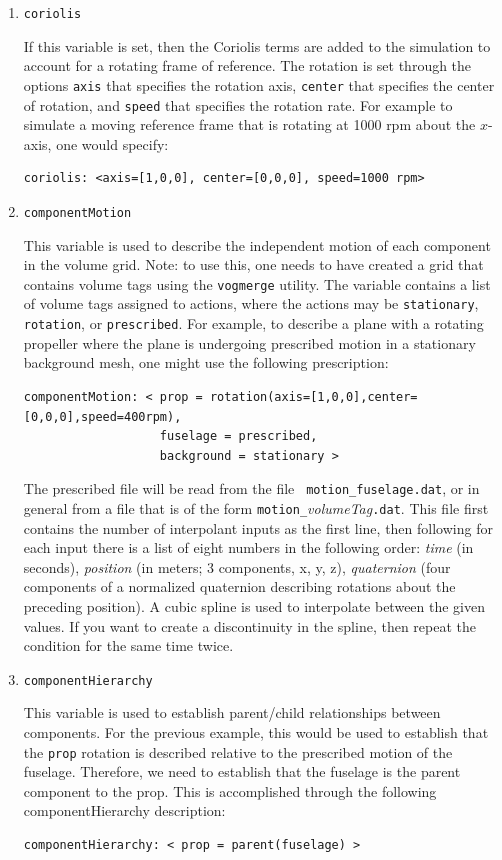 \documentclass{article}
\begin{document}
\begin{enumerate}
\item {\tt coriolis }

  If this variable is set, then the Coriolis terms are added to the
  simulation to account for a rotating frame of reference.  The
  rotation is set through the options {\tt axis} that specifies the
  rotation axis, {\tt center} that specifies the center of rotation,
  and {\tt speed} that specifies the rotation rate.  For example
  to simulate a moving reference frame that is rotating at 1000 rpm
  about the $x$-axis, one would specify:
\begin{verbatim}
coriolis: <axis=[1,0,0], center=[0,0,0], speed=1000 rpm>
\end{verbatim}
\item {\tt componentMotion }

This variable is used to describe the independent motion of each
component in the volume grid.  Note: to use this, one needs to have
created a grid that contains volume tags using the {\tt vogmerge}
utility.  The variable contains a list of volume tags assigned to
actions, where the actions may be {\tt stationary}, {\tt rotation}, or
{\tt prescribed}.  For example, to describe a plane with a rotating
propeller where the plane is undergoing prescribed motion in a
stationary background mesh, one might use the following prescription:
\begin{verbatim}
componentMotion: < prop = rotation(axis=[1,0,0],center=[0,0,0],speed=400rpm),
                   fuselage = prescribed,
                   background = stationary >
\end{verbatim}
The prescribed file will be read from the file {\tt
  motion\_fuselage.dat}, or in general from a file that is of the form
{\tt motion\_}{\it volumeTag}{\tt .dat}.  This file first contains the
number of interpolant inputs as the first line, then following for
each input there is a list of eight numbers in the following order:
{\it time} (in seconds), {\it position} (in meters; 3 components, x,
y, z), {\it quaternion} (four components of a normalized quaternion
describing rotations about the preceding position).  A cubic spline
is used to interpolate between the given values.  If you want to
create a discontinuity in the spline, then repeat the condition
for the same time twice.

\item {\tt componentHierarchy }

  This variable is used to establish parent/child relationships
  between components.  For the previous example, this would be used to
  establish that the {\tt prop} rotation is described relative to the
  prescribed motion of the fuselage.  Therefore, we need to establish
  that the fuselage is the parent component to the prop.  This is
  accomplished through the following componentHierarchy description:
\begin{verbatim}
componentHierarchy: < prop = parent(fuselage) >
\end{verbatim}


\end{enumerate}
\end{document}
